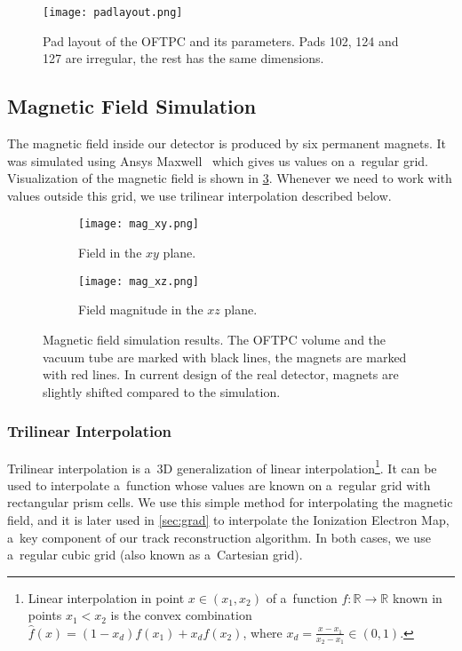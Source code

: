 				\begin{figure}[H]
					\centering
					\texttt{[image: padlayout.png]}
					\caption{Pad layout of the \ac{OFTPC} and its parameters. Pads 102, 124 and 127 are irregular, the rest has the same dimensions.}
					\label{fig:padlayout}
				\end{figure}
		
		\subsection{Magnetic Field Simulation}
		\label{sec:mag}
			The magnetic field inside our detector is produced by six permanent magnets. It was simulated using Ansys Maxwell~\cite{ansys_maxwell} which gives us values on a~regular grid. Visualization of the magnetic field is shown in \cref{fig:mag}. Whenever we need to work with values outside this grid, we use trilinear interpolation described below.
			
			\begin{figure}
				\centering
				\begin{subfigure}[t]{0.45\textwidth}
					\centering
					\texttt{[image: mag\_xy.png]}
					\caption{Field in the $xy$ plane.}
				\end{subfigure}
				\hfill
				\begin{subfigure}[t]{0.45\textwidth}
					\centering
					\texttt{[image: mag\_xz.png]}
					\caption{Field magnitude in the $xz$ plane.}
					\label{fig:mag_xz}
				\end{subfigure}
				\caption{Magnetic field simulation results. The \ac{OFTPC} volume and the vacuum tube are marked with black lines, the magnets are marked with red lines. In current design of the real detector, magnets are slightly shifted compared to the simulation.}
				\label{fig:mag}
			\end{figure}
		
			\subsubsection{Trilinear Interpolation}
			\label{sec:trilin}
				Trilinear interpolation is a~3D generalization of linear interpolation\footnote{Linear interpolation in point $x\in(x_1,x_2)$ of a~function $f\colon\mathbb{R}\to\mathbb{R}$ known in points $x_1 < x_2$ is the convex combination $\widehat{f}(x) = (1-x_d)f(x_1)+x_d f(x_2)$, where $x_d = \frac{x-x_1}{x_2-x_1} \in (0,1)$.}. It can be used to interpolate a~function whose values are known on a~regular grid with rectangular prism cells. We use this simple method for interpolating the magnetic field, and it is later used in \cref{sec:grad} to interpolate the Ionization Electron Map, a~key component of our track reconstruction algorithm. In both cases, we use a~regular cubic grid (also known as a~Cartesian grid).
				
